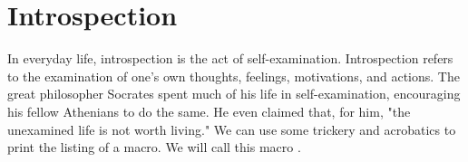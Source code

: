 \section*{Introspection}
In everyday life, introspection is the act of self-examination. Introspection refers to the examination of one's own thoughts, feelings, motivations, and actions. The great philosopher Socrates spent much of his life in self-examination, encouraging his fellow Athenians to do the same. He even claimed that, for him, "the unexamined life is not worth living." We can use some \tex trickery and \latex acrobatics to print the listing of a macro. We will call this macro .

\begin{teX}
\def\reflect{\@star@or@long\accommand}
\def\accommand#1{\string#1:%
  \expandafter\strip@prefix\meaning#1} 
\end{teX}

